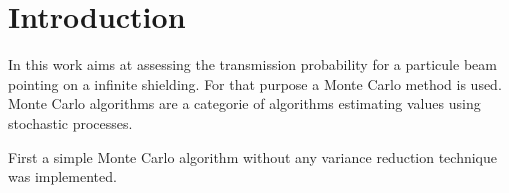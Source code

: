 \section{Introduction}
In this work aims at assessing the transmission probability for a 
particule beam pointing on a infinite shielding. For that purpose a Monte Carlo method is 
used. Monte Carlo algorithms are a categorie of algorithms estimating
values using stochastic processes. 

First a simple Monte Carlo algorithm without any variance reduction technique was 
implemented. 